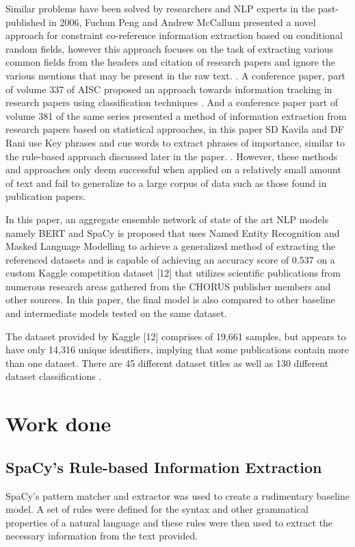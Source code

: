 \documentclass[twocolumn]{article}
\begin{document}
Similar problems have been solved by researchers and NLP experts in the past- published in 2006, Fuchun Peng and Andrew McCallum presented a novel approach for constraint co-reference information extraction based on conditional random fields, however this approach focuses on the task of extracting various common fields from the headers and citation of research papers and ignore the various mentions that may be present in the raw text. \cite{peng-2006}. A conference paper, part of volume 337 of AISC proposed an approach towards information tracking in research papers using classification techniques \cite{priyanka-2015}. And a conference paper part of volume 381 of the same series presented a method of information extraction from research papers based on statistical approaches, in this paper SD Kavila and DF Rani use Key phrases and cue words to extract phrases of importance, similar to the rule-based approach discussed later in the paper. \cite{kavila-2015}. However, these methods and approaches only deem successful when applied on a relatively small amount of text and fail to generalize to a large corpus of data such as those found in publication papers. \par
	
In this paper, an aggregate ensemble network of state of the art NLP models namely BERT and SpaCy is proposed that uses Named Entity Recognition and Masked Language Modelling to achieve a generalized method of extracting the referenced datasets and is capable of achieving an accuracy score of 0.537 on a custom Kaggle competition dataset [12] that utilizes scientific publications from numerous research areas gathered from the CHORUS publisher members and other sources. In this paper, the final model is also compared to other baseline and intermediate models tested on the same dataset. \par
The dataset provided by Kaggle [12] comprises of 19,661 samples, but appears to have only 14,316 unique identifiers, implying that some publications contain more than one dataset. There are 45 different dataset titles as well as 130 different dataset classifications .\par

\section{Work done}
\subsection{SpaCy’s Rule-based Information Extraction}
SpaCy's pattern matcher and extractor was used to create a rudimentary baseline model. A set of rules were defined for the syntax and other grammatical properties of a natural language and these rules were then used to extract the necessary information from the text provided. \par
\end{document}
